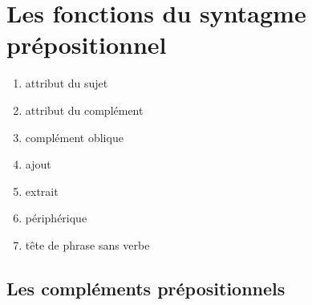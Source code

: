 \documentclass[UTF8]{report}
\begin{document}
\section{Les fonctions du syntagme prépositionnel}
\begin{enumerate}
    \item attribut du sujet
    \item attribut du complément
    \item complément oblique
    \item ajout
    \item extrait
    \item périphérique
    \item tête de phrase sans verbe
\end{enumerate}

\subsection{Les compléments prépositionnels}
\end{document}
